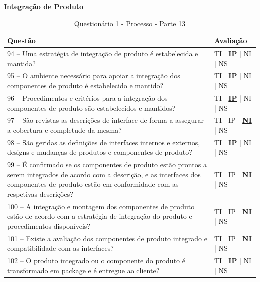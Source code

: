 \documentclass[openany,10pt,a4paper]{article}
\begin{document}
\begin{appendix}
	\begin{table}[h]
	\textbf{Integração de Produto}
		\centering
		\caption{Questionário 1 - Processo - Parte 13}
		\begin{tabular}{p{5in}p{1in}}		
			\toprule
			\textbf{Questão}  & \textbf{Avaliação}\\ 
			\midrule
			94 – Uma estratégia de integração de produto é estabelecida e mantida?
	 & TI | \underline{\textbf{IP}} | NI | NS \\
			\midrule
			95 – O ambiente necessário para apoiar a integração dos componentes de produto é 
	estabelecido e mantido?
	 & TI | \underline{\textbf{IP}} | NI | NS \\
			\midrule
			96 – Procedimentos e critérios para a integração dos componentes de produto são estabelecidos 
	e mantidos?
	 & TI | \underline{\textbf{IP}} | NI | NS \\
			\midrule
			97 – São revistas as descrições de interface de forma a assegurar a cobertura e completude da 
	mesma?
	 & TI | IP | \underline{\textbf{NI}} | NS \\
			\midrule
			98 – São geridas as definições de interfaces internos e externos, designs e mudanças de produtos 
	e componentes de produto?
	  & TI | \underline{\textbf{IP}} | NI | NS \\
			\midrule
			99 – É confirmado se os componentes de produto estão prontos a serem integrados de acordo 
	com a descrição, e as interfaces dos componentes de produto estão em conformidade com as
	respetivas descrições? 
	 & TI | IP | \underline{\textbf{NI}} | NS \\
	 \midrule
			100 – A integração e montagem dos componentes de produto estão de acordo com a estratégia
	de integração do produto e procedimentos disponíveis? 
	 & TI | IP | \underline{\textbf{NI}} | NS \\
	 \midrule
			101 – Existe a avaliação dos componentes de produto integrado e compatibilidade com as
	interfaces? 
	 & TI | IP | \underline{\textbf{NI}} | NS \\
	 \midrule
			102 – O produto integrado ou o componente do produto é transformado em package e é
	entregue ao cliente? 
	 & TI | \underline{\textbf{IP}} | NI | NS \\
			\bottomrule
		\end{tabular} 
	\end{table}
	

\end{appendix}
\end{document}
